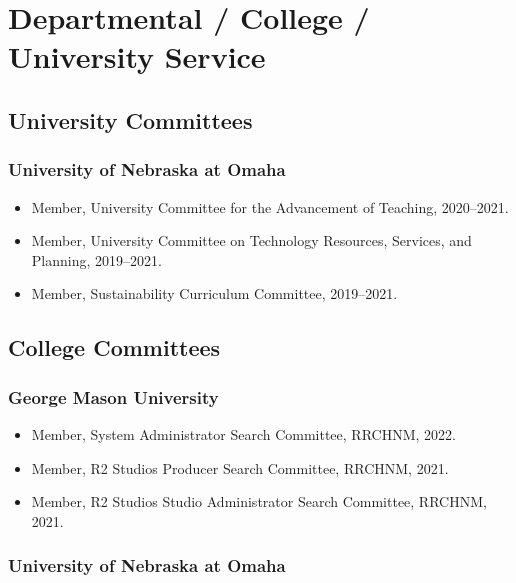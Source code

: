 \documentclass[10pt]{article}
\begin{document}
\vspace{.4cm}

\section{Departmental / College / University Service}

\subsection{University Committees}

\subsubsection*{University of Nebraska at Omaha}

\begin{itemize}
  \item Member, University Committee for the Advancement of Teaching, 2020--2021.
  \item Member, University Committee on Technology Resources, Services, and Planning, 2019--2021.
  \item Member, Sustainability Curriculum Committee, 2019--2021.
\end{itemize}

\subsection{College Committees}

\subsubsection*{George Mason University}

\begin{itemize}
  \item Member, System Administrator Search Committee, RRCHNM, 2022.
  \item Member, R2 Studios Producer Search Committee, RRCHNM, 2021.
  \item Member, R2 Studios Studio Administrator Search Committee, RRCHNM, 2021.
\end{itemize}

\subsubsection*{University of Nebraska at Omaha}
\end{document}
